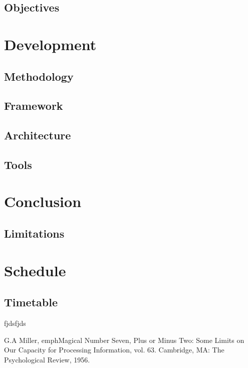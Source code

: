 \documentclass[a4paper, 11pt]{article}
\begin{document}
\subsection{Objectives}
\clearpage


\section{Development}
\subsection{Methodology}
\subsection{Framework}
\subsection{Architecture}
\subsection{Tools}

\clearpage

\section{Conclusion}
\subsection{Limitations}

\clearpage


\section{Schedule}
\subsection{Timetable}

\clearpage


\begin{thebibliography}{11}

	fjdsfjds
	
	G.A Miller, emph{Magical Number Seven, Plus or Minus Two: Some Limits on Our Capacity for Processing Information}, vol. 63. Cambridge, MA: The Psychological Review, 1956.

\end{thebibliography}
\end{document}
